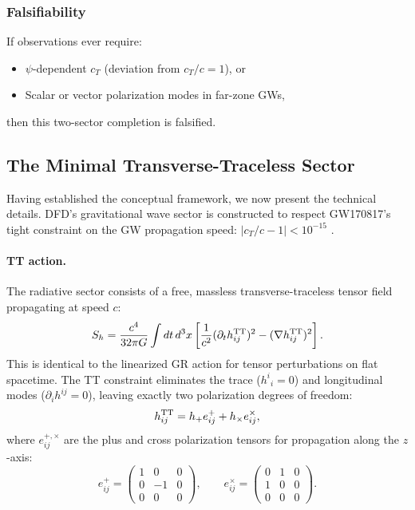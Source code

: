 \subsubsection{Falsifiability}

If observations ever require:
\begin{itemize}
\item $\psi$-dependent $c_T$ (deviation from $c_T/c = 1$), or
\item Scalar or vector polarization modes in far-zone GWs,
\end{itemize}
then this two-sector completion is falsified.

\subsection{The Minimal Transverse-Traceless Sector}\label{sec:gw-tt}

Having established the conceptual framework, we now present the technical details. DFD's gravitational wave sector is constructed to respect GW170817's tight constraint on the GW propagation speed: $|c_T/c - 1| < 10^{-15}$ \cite{Abbott2017GW}.

\paragraph{TT action.}
The radiative sector consists of a free, massless transverse-traceless tensor field propagating at speed $c$:
\begin{equation}\label{eq:gw-action}
S_h = \frac{c^4}{32\pi G}\int dt\, d^3x \left[\frac{1}{c^2}(\partial_t h_{ij}^{\rm TT})^2 - (\nabla h_{ij}^{\rm TT})^2\right].
\end{equation}
This is identical to the linearized GR action for tensor perturbations on flat spacetime. The TT constraint eliminates the trace ($h^i{}_i = 0$) and longitudinal modes ($\partial_i h^{ij} = 0$), leaving exactly two polarization degrees of freedom:
\begin{equation}\label{eq:gw-polarizations}
h_{ij}^{\rm TT} = h_+ e_{ij}^{+} + h_{\times} e_{ij}^{\times},
\end{equation}
where $e_{ij}^{+,\times}$ are the plus and cross polarization tensors for propagation along the $z$-axis:
\begin{equation}
e_{ij}^{+} = \begin{pmatrix} 1 & 0 & 0 \\ 0 & -1 & 0 \\ 0 & 0 & 0 \end{pmatrix}, \qquad
e_{ij}^{\times} = \begin{pmatrix} 0 & 1 & 0 \\ 1 & 0 & 0 \\ 0 & 0 & 0 \end{pmatrix}.
\end{equation}


